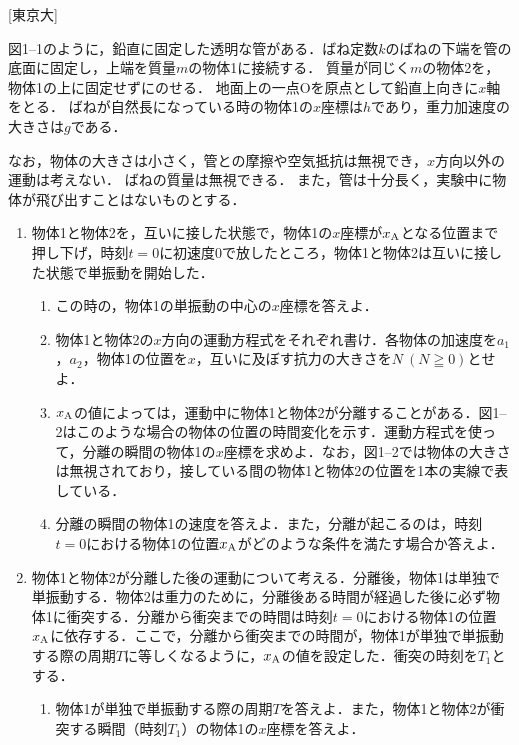 

\noindent
{} [東京大]

図1--1のように，鉛直に固定した透明な管がある．ばね定数$k$のばねの下端を管の底面に固定し，上端を質量$m$の物体1に接続する．
質量が同じく$m$の物体2を，物体1の上に固定せずにのせる．
地面上の一点Oを原点として鉛直上向きに$x$軸をとる．
ばねが自然長になっている時の物体1の$x$座標は$h$であり，重力加速度の大きさは$g$である．

なお，物体の大きさは小さく，管との摩擦や空気抵抗は無視でき，$x$方向以外の運動は考えない．
ばねの質量は無視できる．
また，管は十分長く，実験中に物体が飛び出すことはないものとする．

\begin{enumerate}[I]
  \item {\hzw}物体1と物体2を，互いに接した状態で，物体1の$x$座標が$x_\mathrm{A}$となる位置まで押し下げ，時刻$t = 0$に初速度0で放したところ，物体1と物体2は互いに接した状態で単振動を開始した．
  \begin{enumerate}[label={問\arabic*}]
    \item {\hzw}この時の，物体1の単振動の中心の$x$座標を答えよ．	
    \item {\hzw}物体1と物体2の$x$方向の運動方程式をそれぞれ書け．各物体の加速度を$a_1$，$a_2$，物体1の位置を$x$，互いに及ぼす抗力の大きさを$N \ (N \geqq 0)$とせよ．
    \item {\hzw}$x_\mathrm{A}$の値によっては，運動中に物体1と物体2が分離することがある．図1--2はこのような場合の物体の位置の時間変化を示す．運動方程式を使って，分離の瞬間の物体1の$x$座標を求めよ．なお，図1--2では物体の大きさは無視されており，接している間の物体1と物体2の位置を1本の実線で表している．
    \item {\hzw}分離の瞬間の物体1の速度を答えよ．また，分離が起こるのは，時刻$t=0$における物体1の位置$x_\mathrm{A}$がどのような条件を満たす場合か答えよ．
  \end{enumerate}
  \item {\hzw}物体1と物体2が分離した後の運動について考える．分離後，物体1は単独で単振動する．物体2は重力のために，分離後ある時間が経過した後に必ず物体1に衝突する．分離から衝突までの時間は時刻$t = 0$における物体1の位置$x_\mathrm{A}$に依存する．ここで，分離から衝突までの時間が，物体1が単独で単振動する際の周期$T$に等しくなるように，$x_\mathrm{A}$の値を設定した．衝突の時刻を$T_1$とする．
  \begin{enumerate}[(1)]
    \item {\hzw}物体1が単独で単振動する際の周期$T$を答えよ．また，物体1と物体2が衝突する瞬間（時刻$T_1$）の物体1の$x$座標を答えよ．

\end{enumerate}
\end{enumerate}
